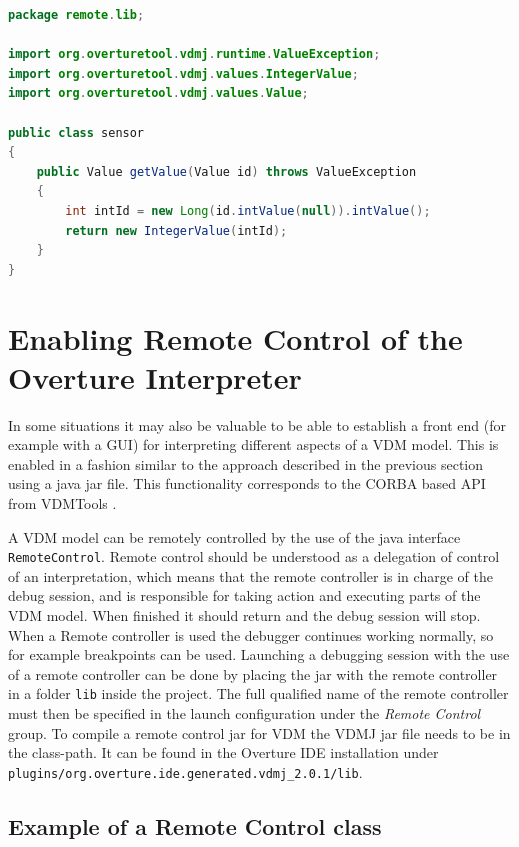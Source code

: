 \documentclass{overturerepsec}
\begin{document}
\begin{lstlisting}[language=JAVA,label=remoteSensorJava,caption=Remote sensor Java class,captionpos=b]
package remote.lib;

import org.overturetool.vdmj.runtime.ValueException;
import org.overturetool.vdmj.values.IntegerValue;
import org.overturetool.vdmj.values.Value;

public class sensor
{
	public Value getValue(Value id) throws ValueException
	{
		int intId = new Long(id.intValue(null)).intValue();
		return new IntegerValue(intId);
	}
}
\end{lstlisting}

\section{Enabling Remote Control of the Overture
  Interpreter}\label{sec:remote}

In some situations it may also be valuable to be able to establish a
front end (for example with a GUI) for interpreting different aspects
of a VDM model. This is enabled in a fashion similar to the approach described in the 
previous section using a java jar file. This functionality corresponds
to the CORBA based API from VDMTools \cite{APIMan}.

A VDM model can be remotely controlled by the use of the java interface
\texttt{RemoteControl}. Remote control should be understood as a
delegation of control of an interpretation, which means that the remote
controller is in charge of the debug session, and is responsible for taking
action and executing parts of the VDM model. When finished it should
return and the debug session will stop. When a Remote controller is
used the debugger continues working normally, so for example breakpoints can be
used. Launching a debugging session with the use of a remote
controller can be done by placing the jar with the remote controller
in a folder \texttt{lib} inside the project. The full
qualified name of the remote controller must then be specified in the launch configuration
under the \textit{Remote Control} group.  To compile a remote control
jar for VDM the VDMJ jar file needs to be in the class-path. It can be found
in the Overture IDE installation
under\\ \texttt{plugins/org.overture.ide.generated.vdmj\_2.0.1/lib}.

\subsection{Example of a Remote Control class}
\end{document}
